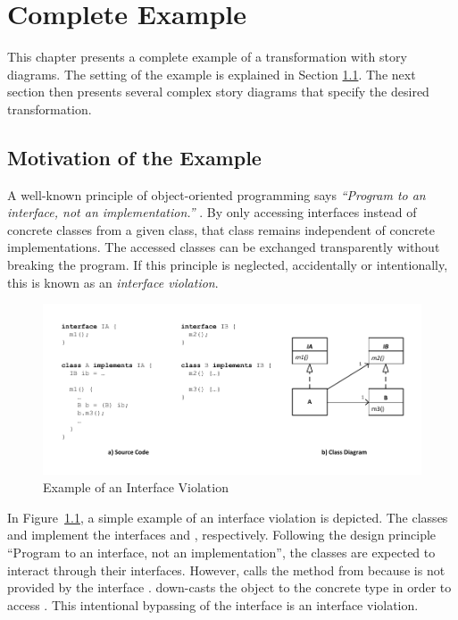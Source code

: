 \chapter{Complete Example} \label{sec:Example}

This chapter presents a complete example of a transformation with story diagrams. The setting of the example is explained in Section \ref{sec:Example:Motivation}. The next section then presents several complex story diagrams that specify the desired transformation.

\section{Motivation of the Example}
\label{sec:Example:Motivation}

A well-known principle of object-oriented programming says \emph{``Program to an interface, not an implementation.''} \cite{GHJV95}. By only accessing interfaces instead of concrete classes from a given class, that class remains independent of concrete implementations. The accessed classes can be exchanged transparently without breaking the program. If this principle is neglected, accidentally or intentionally, this is known as an \emph{interface violation}.

\begin{figure}[hbtp]
\centering
\includegraphics[width=\linewidth]{./figures/InterfaceViolation}
\caption{Example of an Interface Violation}
\label{fig:InterfaceViolationExample}
\end{figure}

In Figure~\ref{fig:InterfaceViolationExample}, a simple example of an interface violation is depicted. The classes  and  implement the interfaces  and , respectively. Following the design principle ``Program to an interface, not an implementation'', the classes are expected to interact through their interfaces. However,  calls the method  from  because  is not provided by the interface .  down-casts the object  to the concrete type  in order to access . This intentional bypassing of the interface  is an interface violation.

